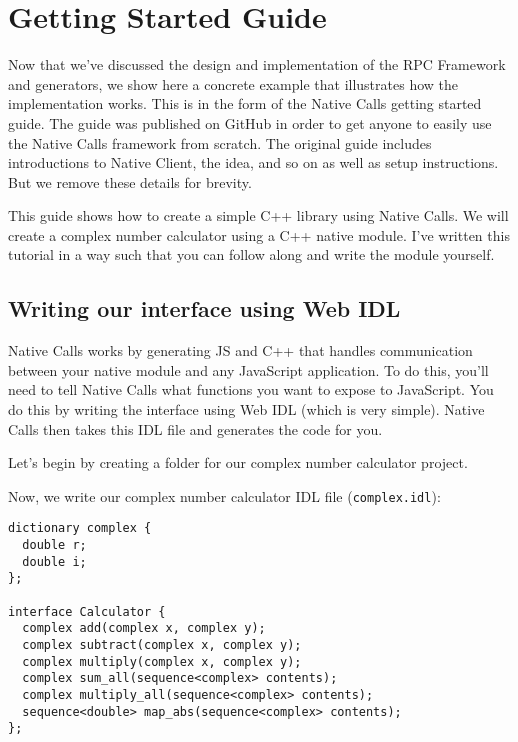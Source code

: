 \section{Getting Started Guide} %
\label{sec:end_to_end_example}
Now that we've discussed the design and implementation of the RPC Framework and generators, we show here a concrete example that illustrates how the implementation works. This is in the form of the Native Calls getting started guide. The guide was published on GitHub in order to get anyone to easily use the Native Calls framework from scratch. The original guide includes introductions to Native Client, the idea, and so on as well as setup instructions. But we remove these details for brevity.

This guide shows how to create a simple C++ library using Native Calls.
We will create a complex number calculator using a C++ native module.
I've written this tutorial in a way such that you can follow along and
write the module yourself.

\subsection{Writing our interface using Web
IDL}\label{writing-our-interface-using-web-idl}

Native Calls works by generating JS and C++ that handles communication
between your native module and any JavaScript application. To do this,
you'll need to tell Native Calls what functions you want to expose to
JavaScript. You do this by writing the interface using Web IDL (which is
very simple). Native Calls then takes this IDL file and generates the
code for you.

Let's begin by creating a folder for our complex number calculator
project.

\begin{Shaded}
\begin{Highlighting}[]
 
 
 
\end{Highlighting}
\end{Shaded}

Now, we write our complex number calculator IDL file
(\texttt{complex.idl}):

\begin{verbatim}
dictionary complex {
  double r;
  double i;
};

interface Calculator {
  complex add(complex x, complex y);
  complex subtract(complex x, complex y);
  complex multiply(complex x, complex y);
  complex sum_all(sequence<complex> contents);
  complex multiply_all(sequence<complex> contents);
  sequence<double> map_abs(sequence<complex> contents);
};
\end{verbatim}

